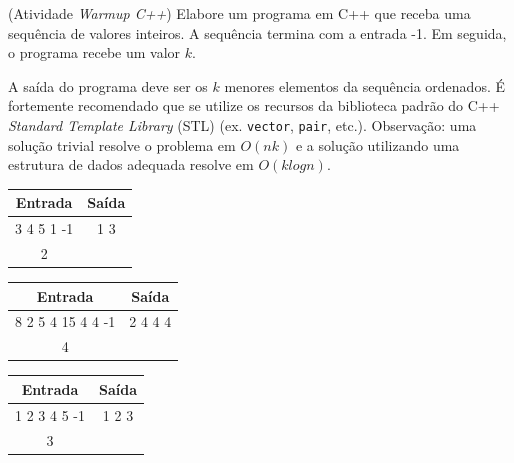 (Atividade \emph{Warmup C++}) Elabore um programa em C++ que receba uma sequência de valores inteiros. A sequência termina com a entrada -1. Em seguida, o programa recebe um valor $k$.

A saída do programa deve ser os $k$ menores elementos da sequência ordenados. É fortemente recomendado que se utilize os recursos da biblioteca padrão do C++ \emph{Standard Template Library} (STL) (ex. \texttt{vector}, \texttt{pair}, etc.). Observação: uma solução trivial resolve o problema em $O(nk)$ e a solução utilizando uma estrutura de dados adequada resolve em $O(klogn)$.

\inout

\begin{table}[!htb]
	\centering
	\begin{minipage}[t]{0.32\textwidth} %
		\centering
		\vspace{0pt}
		\begin{tabular}{cc}
			\hline
			Entrada     & Saída \\ \hline
			3 4 5 1 -1    & 1 3    \\ 
			2        &          \\
			\hline
		\end{tabular}
	\end{minipage}%
	\hfill
	\begin{minipage}[t]{0.32\textwidth} %
		\centering
		\vspace{0pt}
		\begin{tabular}{cc}
			\hline
			Entrada     & Saída \\ \hline
			8 2 5 4 15 4 4 -1    & 2 4 4 4    \\ 
			4        &          \\
			\hline
		\end{tabular}
	\end{minipage}%
	\hfill
	\begin{minipage}[t]{0.32\textwidth} %
		\centering
		\vspace{0pt}
		\begin{tabular}{cc}
			\hline
			Entrada    & Saída \\ \hline
			1 2 3 4 5 -1        &    1 2 3   \\
			3        &       \\ \hline
		\end{tabular}
	\end{minipage}
\end{table}